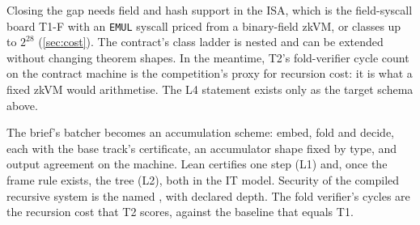 Closing the gap needs field and hash support in the ISA, which is the field-syscall board T1-F with an
\texttt{EMUL} syscall priced from a binary-field zkVM, or classes up to $2^{28}$
(\cref{sec:cost}). The contract's class ladder is nested and can be extended without changing theorem
shapes. In the meantime, T2's fold-verifier cycle count on the contract machine is the competition's
proxy for recursion cost: it is what a fixed zkVM would arithmetise. The L4 statement exists only as
the target schema  above.

\begin{takeaway}[Summary]
The brief's batcher becomes an accumulation scheme: embed, fold and decide, each with the base
track's certificate, an accumulator shape fixed by type, and output agreement on the machine. Lean
certifies one step (L1) and, once the frame rule exists, the tree (L2), both in the IT model. Security
of the compiled recursive system is the named , with declared depth. The
fold verifier's cycles are the recursion cost that T2 scores, against the  baseline
that equals T1.
\end{takeaway}
